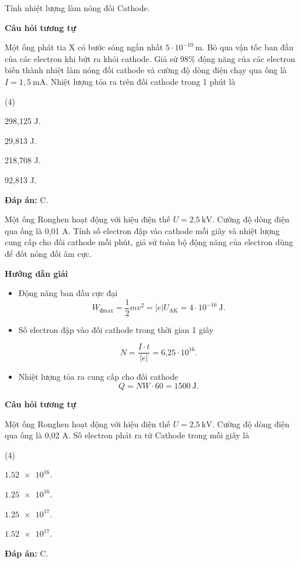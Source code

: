 \begin{dang}{Tính nhiệt lượng làm nóng đối Cathode.}
{\begin{center}
\textbf{Câu hỏi tương tự}
\end{center}

Một ống phát tia X có bước sóng ngắn nhất $5\cdot 10^{-10}\ \text{m}$. Bỏ qua vận tốc ban đầu của các electron khi bứt ra khỏi cathode. Giả sử $98\%$ động năng của các electron biến thành nhiệt làm nóng đối cathode và cường độ dòng điện chạy qua ống là $I = 1,5\ \text{mA}$. Nhiệt lượng tỏa ra trên đối cathode trong 1 phút là 
\begin{mcq}(4)
\item 298,125 J.
\item 29,813 J.
\item 218,708 J.
\item 92,813 J.
\end{mcq}

\textbf{Đáp án:} C.
}
{Một ống Ronghen hoạt động với hiệu điện thế $U =\text{2,5}\ \text{kV}$. Cường độ dòng điện qua ống là 0,01 A. Tính số electron đập vào cathode mỗi giây và nhiệt lượng cung cấp cho đối cathode mỗi phút, giả sử toàn bộ động năng của electron dùng để đốt nóng đối âm cực.
}
{\begin{center}
	\textbf{Hướng dẫn giải}
\end{center}   

\begin{itemize}
	\item Động năng ban đầu cực đại
	\begin{equation*}
		W_{\text{đmax}}=\dfrac{1}{2}mv^2 =|e|U_{\text{AK}}= 4 \cdot 10^{-16}\ \text{J}.
	\end{equation*}
	\item Số electron đập vào đối cathode trong thời gian 1 giây
	
	\begin{equation*}
		N = \dfrac{I \cdot t}{|e|}= \text{6,25} \cdot 10^{16}.
	\end{equation*}
	\item Nhiệt lượng tỏa ra cung cấp cho đối cathode
	\begin{equation*}
		Q=NW \cdot 60 = 1500\ \text{J}.
	\end{equation*}
\end{itemize}      
\begin{center}
\textbf{Câu hỏi tương tự}
\end{center}

Một ống Ronghen hoạt động với hiệu điện thế $U =\text{2,5}\ \text{kV}$. Cường độ dòng điện qua ống là 0,02 A. Số electron phát ra từ Cathode trong mỗi giây là
\begin{mcq}(4)
	\item $ \num{1,52 e16} $.
	\item $ \num{1,25 e16} $.
	\item $ \num{1,25 e17} $.
	\item $ \num{1,52 e17} $.
\end{mcq}

\textbf{Đáp án:} C.
}

\end{dang}
